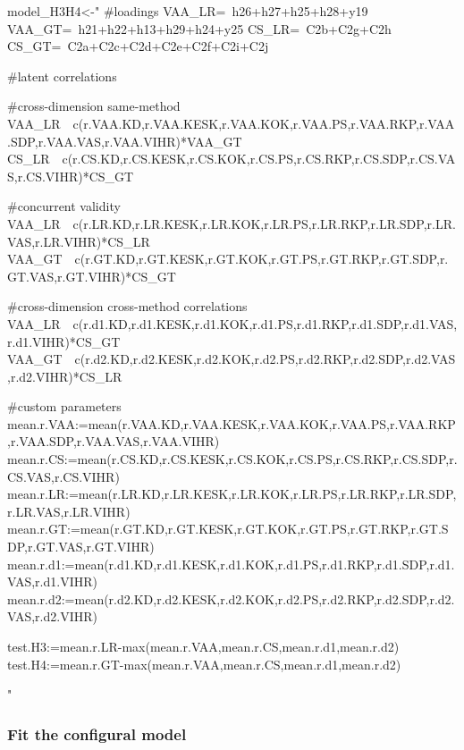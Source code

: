 \documentclass[
]{article}
\newenvironment{Shaded}{\begin{snugshade}}{\end{snugshade}}
\newcommand{\NormalTok}[1]{#1}
\newcommand{\StringTok}[1]{\textcolor[rgb]{0.31,0.60,0.02}{#1}}
\begin{document}
\begin{Shaded}
\begin{Highlighting}[]
\NormalTok{model_H3H4<-}\StringTok{"}
\StringTok{#loadings}
\StringTok{VAA_LR=~h26+h27+h25+h28+y19}
\StringTok{VAA_GT=~h21+h22+h13+h29+h24+y25}
\StringTok{CS_LR=~C2b+C2g+C2h}
\StringTok{CS_GT=~C2a+C2c+C2d+C2e+C2f+C2i+C2j}

\StringTok{#latent correlations}

\StringTok{#cross-dimension same-method}
\StringTok{VAA_LR~~c(r.VAA.KD,r.VAA.KESK,r.VAA.KOK,r.VAA.PS,r.VAA.RKP,r.VAA.SDP,r.VAA.VAS,r.VAA.VIHR)*VAA_GT}
\StringTok{CS_LR~~c(r.CS.KD,r.CS.KESK,r.CS.KOK,r.CS.PS,r.CS.RKP,r.CS.SDP,r.CS.VAS,r.CS.VIHR)*CS_GT}

\StringTok{#concurrent validity}
\StringTok{VAA_LR~~c(r.LR.KD,r.LR.KESK,r.LR.KOK,r.LR.PS,r.LR.RKP,r.LR.SDP,r.LR.VAS,r.LR.VIHR)*CS_LR}
\StringTok{VAA_GT~~c(r.GT.KD,r.GT.KESK,r.GT.KOK,r.GT.PS,r.GT.RKP,r.GT.SDP,r.GT.VAS,r.GT.VIHR)*CS_GT}

\StringTok{#cross-dimension cross-method correlations}
\StringTok{VAA_LR~~c(r.d1.KD,r.d1.KESK,r.d1.KOK,r.d1.PS,r.d1.RKP,r.d1.SDP,r.d1.VAS,r.d1.VIHR)*CS_GT}
\StringTok{VAA_GT~~c(r.d2.KD,r.d2.KESK,r.d2.KOK,r.d2.PS,r.d2.RKP,r.d2.SDP,r.d2.VAS,r.d2.VIHR)*CS_LR}

\StringTok{#custom parameters}
\StringTok{mean.r.VAA:=mean(r.VAA.KD,r.VAA.KESK,r.VAA.KOK,r.VAA.PS,r.VAA.RKP,r.VAA.SDP,r.VAA.VAS,r.VAA.VIHR)}
\StringTok{mean.r.CS:=mean(r.CS.KD,r.CS.KESK,r.CS.KOK,r.CS.PS,r.CS.RKP,r.CS.SDP,r.CS.VAS,r.CS.VIHR)}
\StringTok{mean.r.LR:=mean(r.LR.KD,r.LR.KESK,r.LR.KOK,r.LR.PS,r.LR.RKP,r.LR.SDP,r.LR.VAS,r.LR.VIHR)}
\StringTok{mean.r.GT:=mean(r.GT.KD,r.GT.KESK,r.GT.KOK,r.GT.PS,r.GT.RKP,r.GT.SDP,r.GT.VAS,r.GT.VIHR)}
\StringTok{mean.r.d1:=mean(r.d1.KD,r.d1.KESK,r.d1.KOK,r.d1.PS,r.d1.RKP,r.d1.SDP,r.d1.VAS,r.d1.VIHR)}
\StringTok{mean.r.d2:=mean(r.d2.KD,r.d2.KESK,r.d2.KOK,r.d2.PS,r.d2.RKP,r.d2.SDP,r.d2.VAS,r.d2.VIHR)}

\StringTok{test.H3:=mean.r.LR-max(mean.r.VAA,mean.r.CS,mean.r.d1,mean.r.d2)}
\StringTok{test.H4:=mean.r.GT-max(mean.r.VAA,mean.r.CS,mean.r.d1,mean.r.d2)}

\StringTok{"}
\end{Highlighting}
\end{Shaded}

\hypertarget{fit-the-configural-model}{%
\subsubsection{Fit the configural
model}\label{fit-the-configural-model}}
\end{document}
